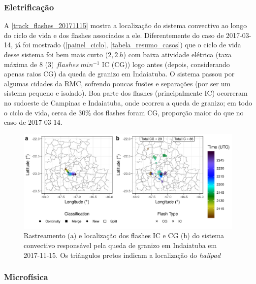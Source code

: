 \subsubsection{Eletrificação}\label{elec_20171115}

A \autoref{track_flashes_20171115} mostra a localização do sistema convectivo ao longo do ciclo de vida e dos flashes associados a ele. Diferentemente do caso de 2017-03-14, já foi mostrado (\autoref{painel_ciclo}, \autoref{tabela_resumo_casos}) que o ciclo de vida desse sistema foi bem mais curto ($2,2\:h$) com baixa atividade elétrica (taxa máxima de 8 (3) $flashes\:min^{-1}$ IC (CG)) logo antes (depois, considerando apenas raios CG) da queda de granizo em Indaiatuba. O sistema passou por algumas cidades da RMC, sofrendo poucas fusões e separações (por ser um sistema pequeno e isolado). Boa parte dos flashes (principalmente IC) ocorreram no sudoeste de Campinas e Indaiatuba, onde ocorreu a queda de granizo; em todo o ciclo de vida, cerca de 30\% dos flashes foram CG, proporção maior do que no caso de 2017-03-14.

\begin{figure}[htb]
	\begin{center}
		\caption{Rastreamento (a) e localização dos flashes IC e CG (b) do sistema convectivo responsável pela queda de granizo em Indaiatuba em 2017-11-15. Os triângulos pretos indicam a localização do \textit{hailpad}} 
		\label{track_flashes_20171115}
		\includegraphics[width=\columnwidth]{../General_Processing/figures/track_flashes_20171115.png}
	\end{center}
\end{figure}

\subsubsection{Microfísica}\label{micro_20171115}

